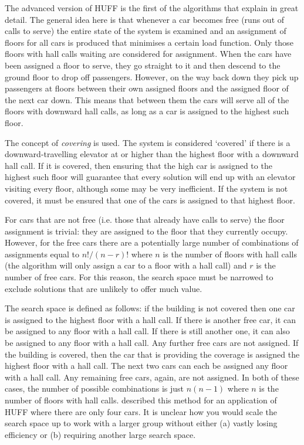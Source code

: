 \documentclass{UoYCSproject}
\begin{document}
The advanced version of HUFF is the first of the algorithms that \citet{Bao1994} explain in great detail.  The general idea here is that whenever a car becomes free (runs out of calls to serve) the entire state of the system is examined and an assignment of floors for all cars is produced that minimises a certain load function.  Only those floors with hall calls waiting are considered for assignment.  When the cars have been assigned a floor to serve, they go straight to it and then descend to the ground floor to drop off passengers.  However, on the way back down they pick up passengers at floors between their own assigned floors and the assigned floor of the next car down.  This means that between them the cars will serve all of the floors with downward hall calls, as long as a car is assigned to the highest such floor.

The concept of \textit{covering} is used.  The system is considered `covered' if there is a downward-travelling elevator at or higher than the highest floor with a downward hall call.  If it is covered, then ensuring that the high car is assigned to the highest such floor will guarantee that every solution will end up with an elevator visiting every floor, although some may be very inefficient.  If the system is not covered, it must be ensured that one of the cars is assigned to that highest floor.

For cars that are not free (i.e. those that already have calls to serve) the floor assignment is trivial: they are assigned to the floor that they currently occupy.  However, for the free cars there are a potentially large number of combinations of assignments equal to $n! / (n-r)!$ where $n$ is the number of floors with hall calls (the algorithm will only assign a car to a floor with a hall call) and $r$ is the number of free cars.  For this reason, the search space must be narrowed to exclude solutions that are unlikely to offer much value.

The search space is defined as follows: if the building is not covered then one car is assigned to the highest floor with a hall call.  If there is another free car, it can be assigned to any floor with a hall call.  If there is still another one, it can also be assigned to any floor with a hall call.  Any further free cars are not assigned.  If the building is covered, then the car that is providing the coverage is assigned the highest floor with a hall call.  The next two cars can each be assigned any floor with a hall call.  Any remaining free cars, again, are not assigned.  In both of these cases, the number of possible combinations is just $n(n-1)$ where $n$ is the number of floors with hall calls.  \citet{Bao1994} described this method for an application of HUFF where there are only four cars.  It is unclear how you would scale the search space up to work with a larger group without either (a) vastly losing efficiency or (b) requiring another large search space.
\end{document}
